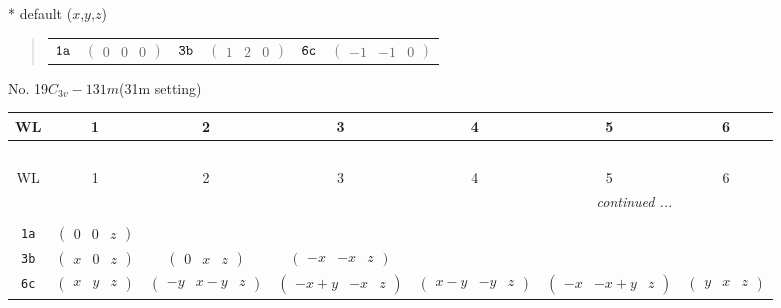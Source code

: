 \documentclass[fleqn,9pt,landscape]{jsarticle}
\begin{document}
* default ($x$,$y$,$z$)
\begin{quote}
\begin{tabular}{cccccc}
$ {\tt 1a} $ & $ \begin{pmatrix} 0 & 0 & 0 \end{pmatrix} $ & $ {\tt 3b} $ & $ \begin{pmatrix} 1 & 2 & 0 \end{pmatrix} $ & $ {\tt 6c} $ & $ \begin{pmatrix} -1 & -1 & 0 \end{pmatrix} $
\end{tabular}
\end{quote}
\newpage
No. 19\quad$C_{3v}-1$\quad$31m$\quad(31m setting)\quad[ trigonal ]
\begin{center}
\renewcommand{\arraystretch}{1.2}
\begin{longtable}{ccccccc}
 \hline \hline
WL & 1 & 2 & 3 & 4 & 5 & 6 \\ \hline \endfirsthead

\multicolumn{6}{l}{\tablename\ \thetable{}} \\
 \hline \hline
WL & 1 & 2 & 3 & 4 & 5 & 6 \\ \hline \endhead

 \hline \hline
\multicolumn{6}{r}{\footnotesize\it continued ...} \\ \endfoot

 \hline \hline
\multicolumn{6}{r}{} \\ \endlastfoot

{\tt 1a} & $ \begin{pmatrix} 0 & 0 & z \end{pmatrix} $ & $  $ & $  $ & $  $ & $  $ & $  $ \\ \hline
{\tt 3b} & $ \begin{pmatrix} x & 0 & z \end{pmatrix} $ & $ \begin{pmatrix} 0 & x & z \end{pmatrix} $ & $ \begin{pmatrix} - x & - x & z \end{pmatrix} $ & $  $ & $  $ & $  $ \\ \hline
{\tt 6c} & $ \begin{pmatrix} x & y & z \end{pmatrix} $ & $ \begin{pmatrix} - y & x - y & z \end{pmatrix} $ & $ \begin{pmatrix} - x + y & - x & z \end{pmatrix} $ & $ \begin{pmatrix} x - y & - y & z \end{pmatrix} $ & $ \begin{pmatrix} - x & - x + y & z \end{pmatrix} $ & $ \begin{pmatrix} y & x & z \end{pmatrix} $ \\
\end{longtable}
\end{center}
\end{document}

